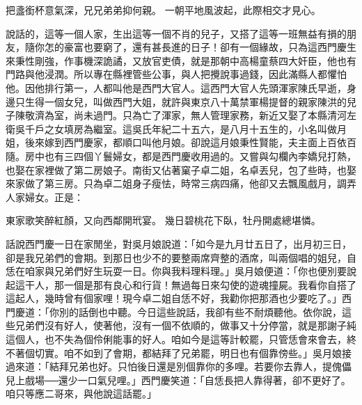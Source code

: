 \begin{showcontents}{}
把盞銜杯意氣深，兄兄弟弟抑何親。
一朝平地風波起，此際相交才見心。


說話的，這等一個人家，生出這等一個不肖的兒子，又搭了這等一班無益有損的朋友，隨你怎的豪富也要窮了，還有甚長進的日子！卻有一個緣故，只為這西門慶生來秉性剛強，作事機深詭譎，又放官吏債，就是那朝中高楊童蔡四大奸臣，他也有門路與他浸潤。所以專在縣裡管些公事，與人把攪說事過錢，因此滿縣人都懼怕他。因他排行第一，人都叫他是西門大官人。這西門大官人先頭渾家陳氏早逝，身邊只生得一個女兒，叫做西門大姐，就許與東京八十萬禁軍楊提督的親家陳洪的兒子陳敬濟為室，尚未過門。只為亡了渾家，無人管理家務，新近又娶了本縣清河左衛吳千戶之女填房為繼室。這吳氏年紀二十五六，是八月十五生的，小名叫做月姐，後來嫁到西門慶家，都順口叫他月娘。卻說這月娘秉性賢能，夫主面上百依百隨。房中也有三四個丫鬟婦女，都是西門慶收用過的。又嘗與勾欄內李嬌兒打熱，也娶在家裡做了第二房娘子。南街又佔著窠子卓二姐，名卓丟兒，包了些時，也娶來家做了第三房。只為卓二姐身子瘦怯，時常三病四痛，他卻又去飄風戲月，調弄人家婦女。正是：

東家歌笑醉紅顏，又向西鄰開玳宴。
幾日碧桃花下臥，牡丹開處總堪憐。

話說西門慶一日在家閒坐，對吳月娘說道：「如今是九月廿五日了，出月初三日，卻是我兄弟們的會期。到那日也少不的要整兩席齊整的酒席，叫兩個唱的姐兒，自恁在咱家與兄弟們好生玩耍一日。你與我料理料理。」吳月娘便道：「你也便別要說起這干人，那一個是那有良心和行貨！無過每日來勾使的遊魂撞屍。我看你自搭了這起人，幾時曾有個家哩！現今卓二姐自恁不好，我勸你把那酒也少要吃了。」西門慶道：「你別的話倒也中聽。今日這些說話，我卻有些不耐煩聽他。依你說，這些兄弟們沒有好人，使著他，沒有一個不依順的，做事又十分停當，就是那謝子純這個人，也不失為個伶俐能事的好人。咱如今是這等計較罷，只管恁會來會去，終不著個切實。咱不如到了會期，都結拜了兄弟罷，明日也有個靠傍些。」吳月娘接過來道：「結拜兄弟也好。只怕後日還是別個靠你的多哩。若要你去靠人，提傀儡兒上戲場──還少一口氣兒哩。」西門慶笑道：「自恁長把人靠得著，卻不更好了。咱只等應二哥來，與他說這話罷。」


\end{showcontents}
